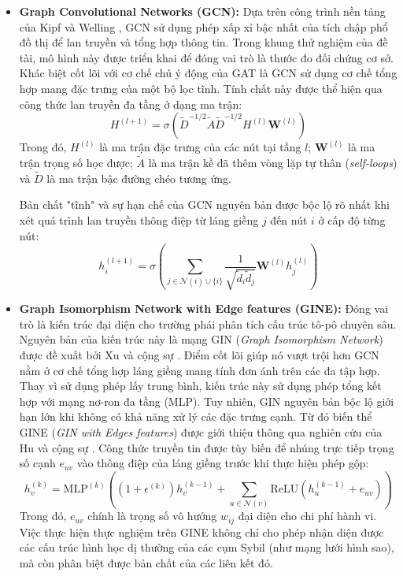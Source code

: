 \begin{itemize}[label={--}, itemsep=5pt]
    \item \textbf{Graph Convolutional Networks (GCN):} Dựa trên công trình nền tảng của Kipf và Welling \cite{kipf2016variational}, GCN sử dụng phép xấp xỉ bậc nhất của tích chập phổ đồ thị để lan truyền và tổng hợp thông tin. Trong khung thử nghiệm của đề tài, mô hình này được triển khai để đóng vai trò là thước đo đối chứng cơ sở. Khác biệt cốt lõi với cơ chế chú ý động của GAT là GCN sử dụng cơ chế tổng hợp mang đặc trưng của một bộ lọc tĩnh. Tính chất này được thể hiện qua công thức lan truyền đa tầng ở dạng ma trận:
    \[
        H^{(l+1)} = \sigma\left( \tilde{D}^{-1/2} \tilde{A} \tilde{D}^{-1/2} H^{(l)} \mathbf{W}^{(l)} \right)
    \]
    Trong đó, $H^{(l)}$ là ma trận đặc trưng của các nút tại tầng $l$; $\mathbf{W}^{(l)}$ là ma trận trọng số học được; $\tilde{A}$ là ma trận kề đã thêm vòng lặp tự thân (\textit{self-loops}) và $\tilde{D}$ là ma trận bậc đường chéo tương ứng.\vspace{0.3cm}

    Bản chất "tĩnh" và sự hạn chế của GCN nguyên bản được bộc lộ rõ nhất khi xét quá trình lan truyền thông điệp từ láng giềng $j$ đến nút $i$ ở cấp độ từng nút:
    \[
        h_i^{(l+1)} = \sigma \left( \sum_{j \in \mathcal{N}(i) \cup \{i\}} \frac{1}{\sqrt{\tilde{d}_i \tilde{d}_j}} \mathbf{W}^{(l)} h_j^{(l)} \right)
    \]

    \item \textbf{Graph Isomorphism Network with Edge features (GINE):} Đóng vai trò là kiến trúc đại diện cho trường phái phân tích cấu trúc tô-pô chuyên sâu. Nguyên bản của kiến trúc này là mạng GIN (\textit{Graph Isomorphism Network}) được đề xuất bởi Xu và cộng sự \cite{xu2018powerful}. Điểm cốt lõi giúp nó vượt trội hơn GCN nằm ở cơ chế tổng hợp láng giềng mang tính đơn ánh trên các đa tập hợp. Thay vì sử dụng phép lấy trung bình, kiến trúc này sử dụng phép tổng kết hợp với mạng nơ-ron đa tầng (MLP). Tuy nhiên, GIN nguyên bản bộc lộ giới hạn lớn khi không có khả năng xử lý các đặc trưng cạnh. Từ đó biến thể GINE (\textit{GIN with Edges features}) được giới thiệu thông qua nghiên cứu của Hu và cộng sự \cite{hu2019strategies}. Công thức truyền tin được tùy biến để nhúng trực tiếp trọng số cạnh $e_{uv}$ vào thông điệp của láng giềng trước khi thực hiện phép gộp:
    \[
        h_v^{(k)} = \text{MLP}^{(k)} \left( (1 + \epsilon^{(k)}) h_v^{(k-1)} + \sum_{u \in \mathcal{N}(v)} \text{ReLU} \left( h_u^{(k-1)} + e_{uv} \right) \right)
    \]
    Trong đó, $e_{uv}$ chính là trọng số vô hướng $w_{ij}$ đại diện cho chi phí hành vi. Việc thực hiện thực nghiệm trên GINE không chỉ cho phép nhận diện được các cấu trúc hình học dị thường của các cụm Sybil (như mạng lưới hình sao), mà còn phân biệt được bản chất của các liên kết đó.


\end{itemize}
